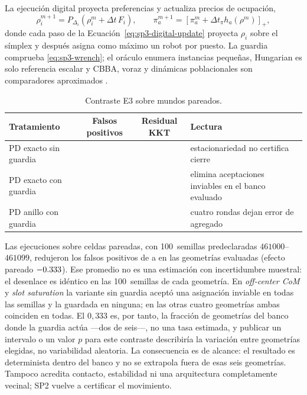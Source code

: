 La ejecución digital proyecta preferencias y actualiza precios de ocupación,
\begin{equation}
 \rho_i^{m+1}=P_{\Delta_i}(\rho_i^m+\Delta t\,F_i),\qquad
 \pi_a^{m+1}=[\pi_a^m+\Delta t_\pi h_a(\rho^m)]_+,
 \label{eq:sp3-digital-update}
\end{equation}
donde cada paso de la Ecuación~\eqref{eq:sp3-digital-update} proyecta $\rho_i$
sobre el símplex y después asigna como máximo un robot por puesto. La guardia comprueba
\eqref{eq:sp3-wrench}; el oráculo enumera instancias pequeñas, Hungarian es solo
referencia escalar y CBBA, voraz y dinámicas poblacionales son comparadores
aproximados \parencite{kuhn1955Hungarian,choiBrunetHow2009CBBA,sandholm2010population}.

\begin{table}[!htbp]
  \centering
  \caption{Contraste E3 sobre \SPThreeWorlds{} mundos pareados.}
  \label{tab:sp3-results}
  \viutablefont
  \begin{tabularx}{0.96\textwidth}{>{\raggedright\arraybackslash}p{3.65cm} C C Y}
    \toprule
    Tratamiento & Falsos positivos & Residual KKT & Lectura \\
    \midrule
    PD exacto sin guardia & \SPThreeUnguardedFP{} & \SPThreeExactKKT{} & estacionariedad no certifica cierre \\
    PD exacto con guardia & \SPThreeGuardedFP{} & \SPThreeExactKKT{} & elimina aceptaciones inviables en el banco evaluado \\
    PD anillo con guardia & \SPThreeGuardedFP{} & \SPThreeRingKKT{} & cuatro rondas dejan error de agregado \\
    \bottomrule
  \end{tabularx}
  \viuownsource
\end{table}

Las \SPThreeRuns{} ejecuciones sobre \SPThreeWorlds{} celdas pareadas, con
100~semillas predeclaradas $461000$--$461099$, redujeron los falsos positivos
de \SPThreeUnguardedFP{} a \SPThreeGuardedFP{} en las geometrías evaluadas
(efecto pareado $-0.333$). Ese promedio no es una estimación con
incertidumbre muestral: el desenlace es idéntico en las 100~semillas de cada
geometría. En \emph{off-center CoM} y \emph{slot saturation} la variante sin
guardia aceptó una asignación inviable en todas las semillas y la guardada en
ninguna; en las otras cuatro geometrías ambas coinciden en todas. El $0{,}333$
es, por tanto, la fracción de geometrías del banco donde la guardia actúa
---dos de seis---, no una tasa estimada, y publicar un intervalo o un valor $p$
para este contraste describiría la variación entre geometrías elegidas, no
variabilidad aleatoria. La consecuencia es de alcance: el resultado es
determinista dentro del banco y no se extrapola fuera de esas seis geometrías.
Tampoco acredita contacto, estabilidad ni una arquitectura completamente
vecinal; SP2 vuelve a certificar el movimiento.
